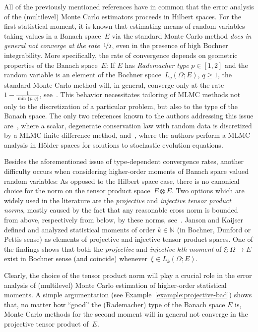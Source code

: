 \documentclass[reqno]{amsart}
\numberwithin{equation}{section}
\newcommand{\bbN}{\mathbb{N}}
\newcommand{\from}{\colon}
\theoremstyle{remark}
\theoremstyle{definition}
\begin{document}
All of the previously mentioned references 
have in common that the error analysis of the 
(multilevel) Monte Carlo estimators proceeds in Hilbert spaces. 
For the first statistical moment, it is known that 
estimating means of random variables taking 
values in a Banach space~$E$ 
via the standard Monte Carlo method 
\emph{does in general not converge at the rate~$\nicefrac{1}{2}$}, 
even in the presence of high Bochner integrability. 
More specifically, the rate of convergence 
depends on geometric properties of the Banach space~$E$: 
If $E$ has \emph{Rademacher type}  
$p\in[1,2]$ and the random variable is an 
element of the Bochner space~$L_q(\Omega;E)$, $q\geq 1$, 
the standard Monte Carlo method will, 
in general, converge only 
at the rate~$1-\tfrac{1}{\min\{p,q\}}$, 
see~\cite[Proposition~9.11]{LedouxTalagrand2011}. 
This behavior necessitates 
tailoring of MLMC methods 
not only to the discretization 
of a particular problem, but also  
to the type of the Banach space. 
The only two references known to the authors 
addressing this issue are~\cite{KoleyRisebroSchwabWeber2017},
where a scalar, degenerate conservation law with random data
is discretized by a MLMC finite difference method, 
and~\cite{CoxEtAl2021}, 
where the authors perform a MLMC  analysis in 
H\"older spaces for solutions to 
stochastic evolution equations. 

Besides the aforementioned issue 
of type-dependent convergence rates, 
another difficulty occurs when considering 
higher-order moments of Banach space valued 
random variables: 
As opposed to the Hilbert space case, 
there is no canonical choice for  
the norm on the tensor product space~$E\otimes E$. 
Two options which are widely used in the literature 
are the \emph{projective} and 
\emph{injective tensor product norms}, 
mostly caused by the fact that any reasonable 
cross norm is bounded from above, respectively from below, 
by these norms, see~\cite[Proposition~6.1(a)]{Ryan2002}. 
% 
Janson and Kaijser~\cite{JansonKaijser2015} 
defined and analyzed 
statistical moments of order $k\in\bbN$ 
(in Bochner, Dunford or Pettis sense) 
as elements of projective and injective 
tensor product spaces. 
One of the findings \cite[Theorem~3.8]{JansonKaijser2015} 
shows that 
both the \emph{projective} and \emph{injective $k$th 
	moment} of $\xi\from\Omega\to E$ exist in Bochner sense 
(and coincide) whenever~$\xi\in L_k(\Omega;E)$. 

Clearly, the choice of the tensor product norm 
will play a crucial role in the error analysis 
of (multilevel) Monte Carlo estimation 
of higher-order statistical moments. 
A simple argumentation 
(see Example~\ref{example:projective-bad})
shows that, 
no matter how ``good'' the (Rademacher) type 
of the Banach space $E$ is, 
Monte Carlo methods for the second moment 
will in general not converge 
in the projective tensor product 
of~$E$.  
\end{document}

